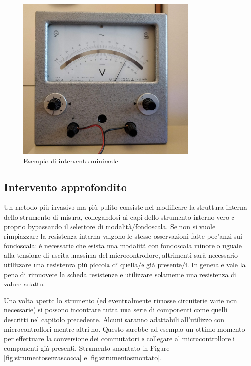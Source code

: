 \documentclass[12pt,a4paper]{report}
\begin{document}
\begin{figure}[h]
  \centering
  \includegraphics[width=0.8\textwidth]{interventominimale}
  \caption{Esempio di intervento minimale}
  \label{fig:interventominimale}
\end{figure}

\subsection{Intervento approfondito}
Un metodo più invasivo ma più pulito consiste nel modificare la struttura interna dello strumento di misura, collegandosi ai capi dello
strumento interno vero e proprio bypassando il selettore di modalità/fondoscala.
Se non si vuole rimpiazzare la resistenza interna valgono le stesse osservazioni fatte poc'anzi sui fondoscala: è necessario che
esista una modalità con fondoscala minore o uguale alla tensione di uscita massima del microcontrollore, altrimenti sarà necessario
utilizzare una resistenza più piccola di quella/e già presente/i.
In generale vale la pena di rimuovere la scheda resistenze e utilizzare solamente una resistenza di valore adatto.

Una volta aperto lo strumento (ed eventualmente rimosse circuiterie varie non necessarie) si possono incontrare tutta una serie
di componenti come quelli descritti nel capitolo precedente. Alcuni saranno adattabili all'utilizzo con microcontrollori mentre altri no.
Questo sarebbe ad esempio un ottimo momento per effettuare la conversione dei commutatori e collegare al microcontrollore
i componenti già presenti. Strumento smontato in Figure \ref{fig:strumentosenzascocca} e \ref{fig:strumentosmontato}.
\end{document}

